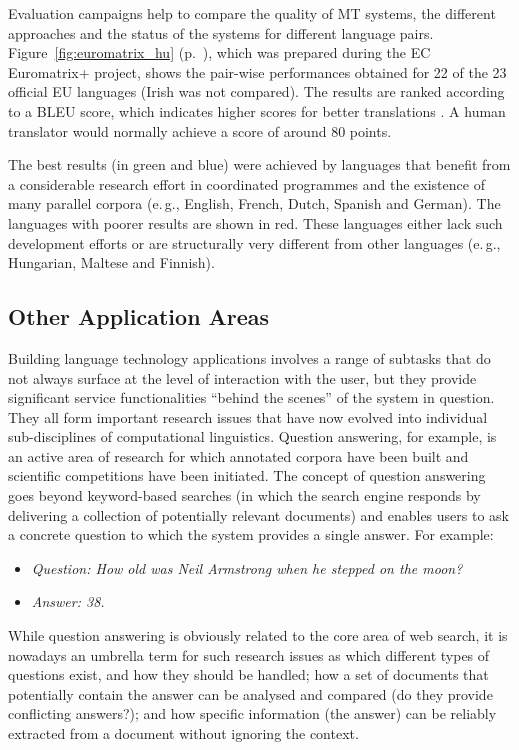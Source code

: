 \begin{multicols}{2}
Evaluation campaigns help to compare the quality of MT systems, the different approaches and the status of the systems for different language pairs. Figure~\ref{fig:euromatrix_hu} (p.~\pageref{fig:euromatrix_hu}), which was prepared during the EC Euromatrix+ project, shows the pair-wise performances obtained for 22 of the 23 official EU languages (Irish was not compared). The results are ranked according to a BLEU score, which indicates higher scores for better translations \cite{bleu1}. A human translator would normally achieve a score of around 80 points.

The best results (in green and blue) were achieved by languages that benefit from a considerable research effort in coordinated programmes and the existence of many parallel corpora (e.\,g., English, French, Dutch, Spanish and German). The languages with poorer results are shown in red. These languages either lack such development efforts or are structurally very different from other languages (e.\,g., Hungarian, Maltese and Finnish).

\subsection{Other Application Areas}

Building language technology applications involves a range of subtasks that do not always surface at the level of interaction with the user, but they provide significant service functionalities “behind the scenes” of the system in question. They all form important research issues that have now evolved into individual sub-disciplines of computational linguistics.  Question answering, for example, is an active area of research for which annotated corpora have been built and scientific competitions have been initiated. The concept of question answering goes beyond keyword-based searches (in which the search engine responds by delivering a collection of potentially relevant documents) and enables users to ask a concrete question to which the system provides a single answer. For example:
\begin{itemize}
  \item[] \textit{Question: How old was Neil Armstrong when he stepped on the moon?}
  \item[] \textit{Answer: 38.}
\end{itemize}

While question answering is obviously related to the core area of web search, it is nowadays an umbrella term for such research issues as which different types of questions exist, and how they should be handled; how a set of documents that potentially contain the answer can be analysed and compared (do they provide conflicting answers?); and how specific information (the answer) can be reliably extracted from a document without ignoring the context. 


\end{multicols}
